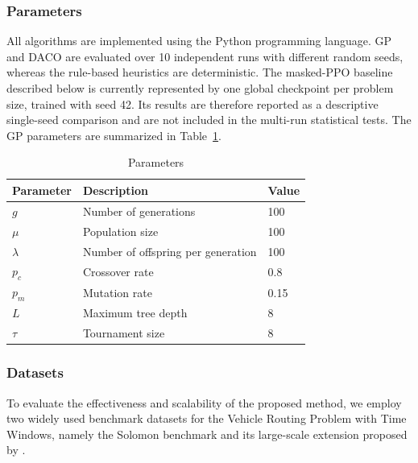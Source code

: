 \documentclass[pdflatex]{sn-jnl}
\begin{document}
\subsubsection{Parameters}
All algorithms are implemented using the Python programming language. GP and
DACO are evaluated over 10 independent runs with different random seeds,
whereas the rule-based heuristics are deterministic. The masked-PPO baseline
described below is currently represented by one global checkpoint per problem
size, trained with seed 42. Its results are therefore reported as a descriptive
single-seed comparison and are not included in the multi-run statistical tests.
The GP parameters are summarized in Table~\ref{tab:paras}.
\begin{table}[h!]
\caption{Parameters} \label{tab:paras}
\centering
\begin{tabular}{p{}|p{}|p{}}
\hline
\textbf{Parameter} & \textbf{Description} & \textbf{Value} \\
\hline
$g$              & Number of generations          & 100 \\
$\mu$            & Population size                & 100 \\
$\lambda$        & Number of offspring per generation & 100 \\
$p_c$            & Crossover rate                 & 0.8 \\
$p_m$            & Mutation rate                  & 0.15 \\
$L$              & Maximum tree depth             & 8 \\
$\tau$           & Tournament size                & 8 \\
\hline
\end{tabular}
\end{table}
\subsubsection{Datasets}
To evaluate the effectiveness and scalability of the proposed method, we employ two widely used benchmark datasets for the Vehicle Routing Problem with Time Windows, namely the Solomon benchmark and its large-scale extension proposed by \cite{hung2025adaptive}.
\end{document}
